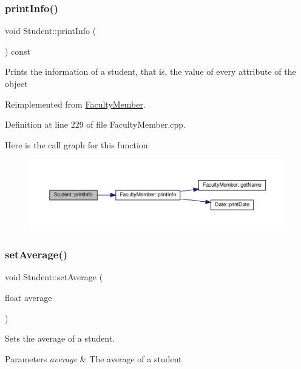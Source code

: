 \subsubsection{\texorpdfstring{print\+Info()}{printInfo()}}
{\footnotesize\ttfamily void Student\+::print\+Info (\begin{DoxyParamCaption}{ }\end{DoxyParamCaption}) const\hspace{0.3cm}{\ttfamily [virtual]}}

Prints the information of a student, that is, the value of every attribute of the object 

Reimplemented from \hyperlink{classFacultyMember_af07c814d58d1a2e309c74a0c57b95fd1}{Faculty\+Member}.



Definition at line 229 of file Faculty\+Member.\+cpp.

Here is the call graph for this function\+:\nopagebreak
\begin{figure}[H]
\begin{center}
\leavevmode
\includegraphics[width=350pt]{classStudent_a3567f5c4220ffa88a8855998b3b99b43_cgraph}
\end{center}
\end{figure}
\mbox{\label{classStudent_a5b0b522fd636bfc266a08129a8784a0a}} 
\subsubsection{\texorpdfstring{set\+Average()}{setAverage()}}
{\footnotesize\ttfamily void Student\+::set\+Average (\begin{DoxyParamCaption}\item[{float}]{average }\end{DoxyParamCaption})}



Sets the average of a student. 


\begin{DoxyParams}{Parameters}
{\em average} & The average of a student \\
\hline
\end{DoxyParams}


